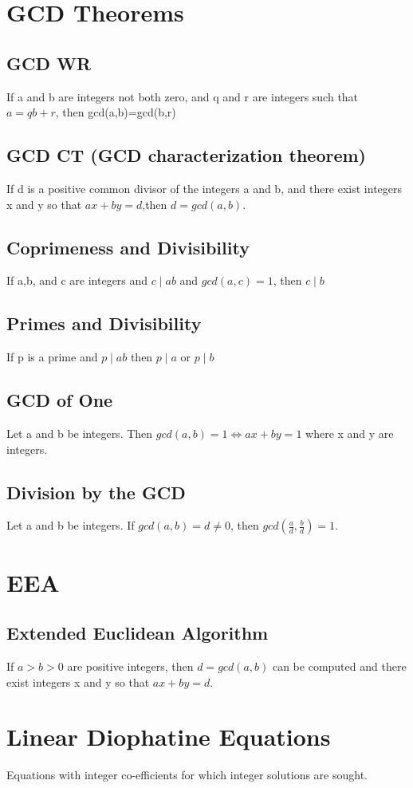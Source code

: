 \documentclass[12pt]{article}
\begin{document}
\section{GCD Theorems}
\subsection{GCD WR}
If a and b are integers not both zero, and q and r are integers such that
$a=qb+r$, then gcd(a,b)=gcd(b,r)
\subsection{GCD CT (GCD characterization theorem)}
If d is a positive common divisor of the integers a and b, and there exist
integers x and y so that $ax+by=d$,then $d=gcd(a,b)$.
\subsection{Coprimeness and Divisibility}
If a,b, and c are integers and $c\mid ab$ and $gcd(a,c)=1$, then $c\mid b$
\subsection{Primes and Divisibility}
If p is a prime and $p\mid ab$ then $p\mid a$ or $p\mid b$
\subsection{GCD of One}
Let a and b be integers. Then $gcd(a,b)=1 \iff ax+by=1$ where x and y are
integers.
\subsection{Division by the GCD}
Let a and b be integers. If $gcd(a,b)=d\neq 0$, then $gcd(\frac{a}{d},
\frac{b}{d})=1$.
\section{EEA}
\subsection{Extended Euclidean Algorithm}
If $a>b>0$ are positive integers, then $d=gcd(a,b)$ can be computed and there
exist integers x and y so that $ax+by=d$.
\section{Linear Diophatine Equations}
Equations with integer co-efficients for which integer solutions are sought.
\end{document}

